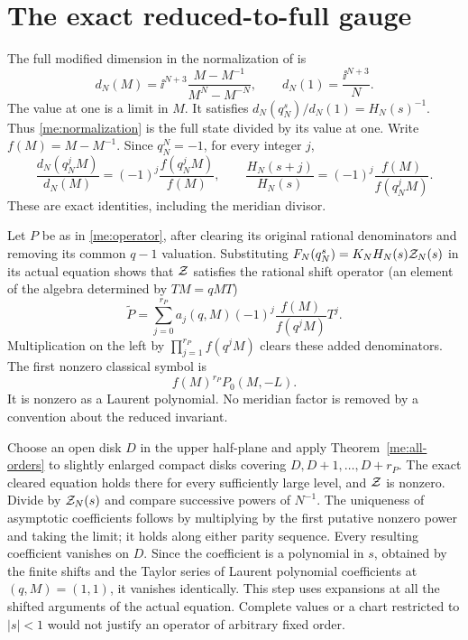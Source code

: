 \section{The exact reduced-to-full gauge}\label{me:gauge}
The full modified dimension in the normalization of
\cite[equation (10.11)]{Finite} is
\begin{equation}\label{me:modified-dimension}
 d_N(M)=\ii^{N+3}\frac{M-M^{-1}}{M^N-M^{-N}},\qquad
 d_N(1)=\frac{\ii^{N+3}}N.
\end{equation}
The value at one is a limit in $M$. It satisfies
$d_N(q_N^s)/d_N(1)=H_N(s)^{-1}$. Thus \eqref{me:normalization}
is the full state divided by its value at one. Write $f(M)=M-M^{-1}$.
Since $q_N^N=-1$, for every integer $j$,
\begin{equation}\label{me:gauge-ratio}
 \frac{d_N(q_N^jM)}{d_N(M)}
          =(-1)^j\frac{f(q_N^jM)}{f(M)},\qquad
 \frac{H_N(s+j)}{H_N(s)}=(-1)^j\frac{f(M)}{f(q_N^jM)}.
\end{equation}
These are exact identities, including the meridian divisor.

Let $P$ be as in \eqref{me:operator}, after clearing its original
rational denominators and removing its common $q-1$ valuation.
Substituting $F_N(q_N^s)=K_NH_N(s)\mathcal Z_N(s)$ in its actual equation
shows that $\mathcal Z$ satisfies the rational shift operator (an element of the algebra determined by
$TM=qMT$)
\begin{equation}\label{me:full-operator}
 \widetilde P=\sum_{j=0}^{r_P}a_j(q,M)(-1)^j
                           \frac{f(M)}{f(q^jM)}T^j.
\end{equation}
Multiplication on the left by $\prod_{j=1}^{r_P}f(q^jM)$ clears
these added denominators. The first nonzero classical symbol is
\begin{equation}\label{me:gauged-symbol}
                     f(M)^{r_P}P_0(M,-L).
\end{equation}
It is nonzero as a Laurent polynomial. No meridian factor is
removed by a convention about the reduced invariant.

Choose an open disk $D$ in the upper half-plane and apply
Theorem~\ref{me:all-orders} to slightly enlarged compact disks
covering $D,D+1,\ldots,D+r_P$. The exact cleared equation holds
there for every sufficiently large level, and $\mathcal Z$ is nonzero.
Divide by $\mathcal Z_N(s)$ and compare successive powers of $N^{-1}$.
The uniqueness of asymptotic coefficients follows by multiplying
by the first putative nonzero power and taking the limit; it holds
along either parity sequence. Every resulting coefficient vanishes
on $D$. Since the coefficient is a polynomial in $s$, obtained
by the finite shifts and the Taylor series of Laurent polynomial
coefficients at $(q,M)=(1,1)$, it vanishes identically.
This step uses expansions at all the shifted arguments of the
actual equation. Complete values or a chart restricted to $|s|<1$
would not justify an operator of arbitrary fixed order.

